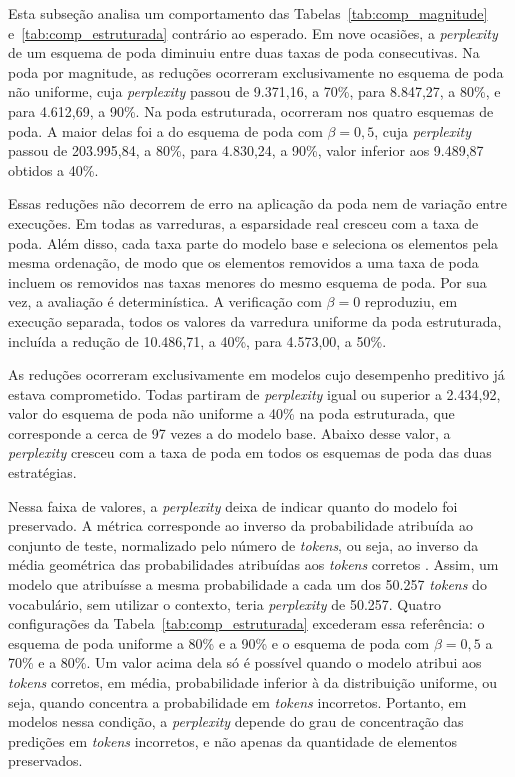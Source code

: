 Esta subseção analisa um comportamento das Tabelas~\ref{tab:comp_magnitude}
e~\ref{tab:comp_estruturada} contrário ao esperado. Em nove ocasiões, a \textit{perplexity} de
um esquema de poda diminuiu entre duas taxas de poda consecutivas. Na poda por magnitude, as
reduções ocorreram exclusivamente no esquema de poda não uniforme, cuja \textit{perplexity}
passou de 9.371,16, a 70\%, para 8.847,27, a 80\%, e para 4.612,69, a 90\%. Na poda
estruturada, ocorreram nos quatro esquemas de poda. A maior delas foi a do esquema de poda com
$\beta = 0{,}5$, cuja \textit{perplexity} passou de 203.995,84, a 80\%, para 4.830,24, a 90\%,
valor inferior aos 9.489,87 obtidos a 40\%.

Essas reduções não decorrem de erro na aplicação da poda nem de variação entre execuções. Em
todas as varreduras, a esparsidade real cresceu com a taxa de poda. Além disso, cada taxa parte
do modelo base e seleciona os elementos pela mesma
ordenação, de modo que os elementos removidos a uma taxa de poda incluem os removidos nas taxas
menores do mesmo esquema de poda. Por sua vez, a avaliação é determinística. A verificação com
$\beta = 0$ reproduziu, em execução separada, todos os
valores da varredura uniforme da poda estruturada, incluída a redução de 10.486,71, a 40\%,
para 4.573,00, a 50\%.

As reduções ocorreram exclusivamente em modelos cujo desempenho preditivo já estava
comprometido. Todas partiram de \textit{perplexity} igual ou superior a 2.434,92, valor do
esquema de poda não uniforme a 40\% na poda estruturada, que corresponde a cerca de 97 vezes a
do modelo base. Abaixo desse valor, a \textit{perplexity} cresceu com a taxa de poda em todos
os esquemas de poda das duas estratégias.

Nessa faixa de valores, a \textit{perplexity} deixa de indicar quanto do modelo foi preservado.
A métrica corresponde ao inverso da probabilidade atribuída ao conjunto de teste, normalizado
pelo número de \textit{tokens}, ou seja, ao inverso da média geométrica das probabilidades
atribuídas aos \textit{tokens} corretos \cite{Jurafsky2025}. Assim, um modelo que atribuísse a
mesma probabilidade a cada um dos 50.257 \textit{tokens} do vocabulário,
sem utilizar o contexto, teria \textit{perplexity} de
50.257. Quatro configurações da Tabela~\ref{tab:comp_estruturada} excederam essa referência: o
esquema de poda uniforme a 80\% e a 90\% e o esquema de poda com $\beta = 0{,}5$ a 70\% e a
80\%. Um valor acima dela só é possível quando o modelo atribui aos \textit{tokens} corretos,
em média, probabilidade inferior à da distribuição uniforme, ou seja, quando concentra a
probabilidade em \textit{tokens} incorretos. Portanto, em modelos nessa condição, a
\textit{perplexity} depende do grau de concentração das predições em \textit{tokens}
incorretos, e não apenas da quantidade de elementos preservados.

